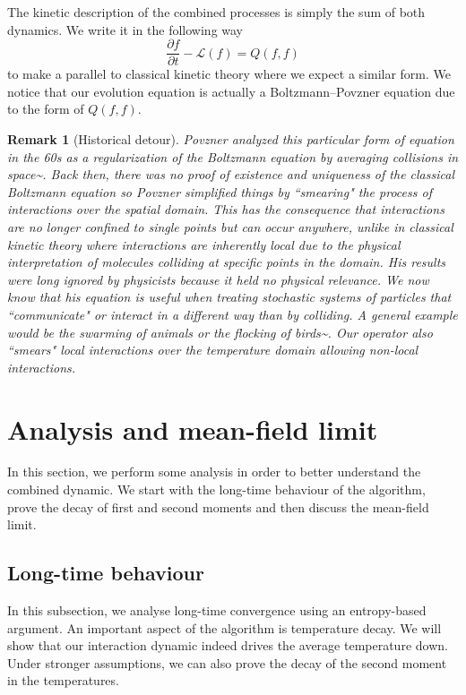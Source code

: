 \documentclass[10pt,a4paper]{article}
\theoremstyle{theorem}
\newtheorem{remark}{Remark}[section]
\numberwithin{equation}{section}
\begin{document}
The kinetic description of the combined processes is simply the sum of both dynamics. We write it in the following way
\begin{equation}
\label{eq:dynamic}
\frac{\partial f}{\partial t}-\mathcal{L}(f)=Q(f,f)
\end{equation}
to make a parallel to classical kinetic theory where we expect a similar form. We notice that our evolution equation is actually a Boltzmann--Povzner equation due to the form of $Q(f,f)$. 
\begin{remark}[Historical detour]
Povzner analyzed this particular form of equation in the 60s as a regularization of the Boltzmann equation by averaging collisions in space^^>\cite{povzner_boltzmann_1962, arkeryd_stationary_1999}. Back then, there was no proof of existence and uniqueness of the classical Boltzmann equation so Povzner simplified things by ``smearing" the process of interactions over the spatial domain. This has the consequence that interactions are no longer confined to single points but can occur anywhere, unlike in classical kinetic theory where interactions are inherently local due to the physical interpretation of molecules colliding at specific points in the domain. His results were long ignored by physicists because it held no physical relevance. We now know that his equation is useful when treating stochastic systems of particles that ``communicate" or interact in a different way than by colliding. A general example would be the swarming of animals or the flocking of birds^^>\cite{pareschi_interacting_2014, naldi_particle_2010, albi_binary_2013}. Our operator also ``smears" local interactions over the temperature domain allowing non-local interactions. 
\end{remark}

\section{Analysis and mean-field limit}
\label{sec:analysis}
In this section, we perform some analysis in order to better understand the combined dynamic. We start with the long-time behaviour of the algorithm, prove the decay of first and second moments and then discuss the mean-field limit.

\subsection{Long-time behaviour}
In this subsection, we analyse long-time convergence using an entropy-based argument. An important aspect of the algorithm is temperature decay. We will show that our interaction dynamic indeed drives the average temperature down. Under stronger assumptions, we can also prove the decay of the second moment in the temperatures. 
\end{document}
